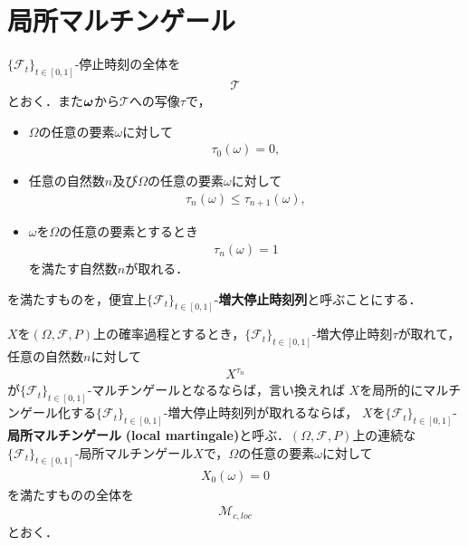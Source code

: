 \section{局所マルチンゲール}
	
	$\{\mathscr{F}_{t}\}_{t \in [0,1]}$-停止時刻の全体を
	\begin{align}
		\mathscr{T}
	\end{align}
	とおく．また${\boldsymbol \omega}$から$\mathscr{T}$への写像$\tau$で，
	\begin{itemize}
		\item $\Omega$の任意の要素$\omega$に対して
			\begin{align}
				\tau_{0}(\omega) = 0,
			\end{align}
			
		\item 任意の自然数$n$及び$\Omega$の任意の要素$\omega$に対して
			\begin{align}
				\tau_{n}(\omega) \leq \tau_{n+1}(\omega),
			\end{align}
			
		\item $\omega$を$\Omega$の任意の要素とするとき
			\begin{align}
				\tau_{n}(\omega) = 1
			\end{align}
			を満たす自然数$n$が取れる．
	\end{itemize}
	
	を満たすものを，便宜上$\{\mathscr{F}_{t}\}_{t \in [0,1]}$-{\bf 増大停止時刻列}と呼ぶことにする．
	
	\begin{screen}
		\begin{dfn}[局所マルチンゲール]
			$X$を$(\Omega,\mathscr{F},P)$上の確率過程とするとき，$\{\mathscr{F}_{t}\}_{t \in [0,1]}$-増大停止時刻$\tau$が取れて，
			任意の自然数$n$に対して
			\begin{align}
				X^{\tau_{n}}
			\end{align}
			が$\{\mathscr{F}_{t}\}_{t \in [0,1]}$-マルチンゲールとなるならば，言い換えれば
			$X$を局所的にマルチンゲール化する$\{\mathscr{F}_{t}\}_{t \in [0,1]}$-増大停止時刻列が取れるならば，
			$X$を$\{\mathscr{F}_{t}\}_{t \in [0,1]}$-{\bf 局所マルチンゲール}
			{\bf (local martingale)}と呼ぶ．$(\Omega,\mathscr{F},P)$上の連続な
			$\{\mathscr{F}_{t}\}_{t \in [0,1]}$-局所マルチンゲール$X$で，$\Omega$の任意の要素$\omega$に対して
			\begin{align}
				X_{0}(\omega) = 0
			\end{align}
			を満たすものの全体を
			\begin{align}
				\mathscr{M}_{c,loc}
			\end{align}
			とおく．
		\end{dfn}
	\end{screen}
	
